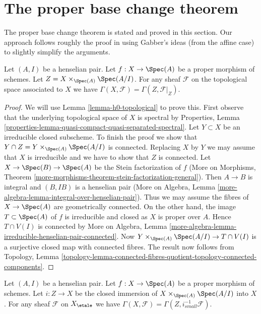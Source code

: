 \section{The proper base change theorem}
\label{section-proper-base-change}

\noindent
The proper base change theorem is stated and proved in this section.
Our approach follows roughly the proof in \cite[XII, Theorem 5.1]{SGA4}
using Gabber's ideas (from the affine case) to slightly simplify
the arguments.

\begin{lemma}
\label{lemma-zariski-h0-proper-over-henselian-pair}
Let $(A, I)$ be a henselian pair. Let $f : X \to \Spec(A)$ be a proper morphism
of schemes. Let $Z = X \times_{\Spec(A)} \Spec(A/I)$. For any
sheaf $\mathcal{F}$ on the topological space associated to $X$ we
have $\Gamma(X, \mathcal{F}) = \Gamma(Z, \mathcal{F}|_Z)$.
\end{lemma}

\begin{proof}
We will use Lemma \ref{lemma-h0-topological} to prove this. First observe
that the underlying topological space of $X$ is spectral by Properties, Lemma
\ref{properties-lemma-quasi-compact-quasi-separated-spectral}.
Let $Y \subset X$ be an irreducible closed subscheme. To finish the proof
we show that $Y \cap Z = Y \times_{\Spec(A)} \Spec(A/I)$ is connected.
Replacing $X$ by $Y$
we may assume that $X$ is irreducible and we have to show that $Z$
is connected. Let $X \to \Spec(B) \to \Spec(A)$ be the Stein factorization
of $f$ (More on Morphisms, Theorem
\ref{more-morphisms-theorem-stein-factorization-general}).
Then $A \to B$ is integral and $(B, IB)$ is a henselian pair
(More on Algebra, Lemma \ref{more-algebra-lemma-integral-over-henselian-pair}).
Thus we may assume the fibres of $X \to \Spec(A)$ are geometrically
connected. On the other hand, the image $T \subset \Spec(A)$ of $f$
is irreducible and closed as $X$ is proper over $A$. Hence $T \cap V(I)$
is connected by More on Algebra, Lemma
\ref{more-algebra-lemma-irreducible-henselian-pair-connected}.
Now $Y \times_{\Spec(A)} \Spec(A/I) \to T \cap V(I)$
is a surjective closed map with connected fibres.
The result now follows from Topology, Lemma
\ref{topology-lemma-connected-fibres-quotient-topology-connected-components}.
\end{proof}

\begin{lemma}
\label{lemma-h0-proper-over-henselian-pair}
Let $(A, I)$ be a henselian pair. Let $f : X \to \Spec(A)$ be a proper morphism
of schemes. Let $i : Z \to X$ be the closed immersion of
$X \times_{\Spec(A)} \Spec(A/I)$ into $X$. For any
sheaf $\mathcal{F}$ on $X_\etale$ we
have $\Gamma(X, \mathcal{F}) = \Gamma(Z, i_{small}^{-1}\mathcal{F})$.
\end{lemma}

